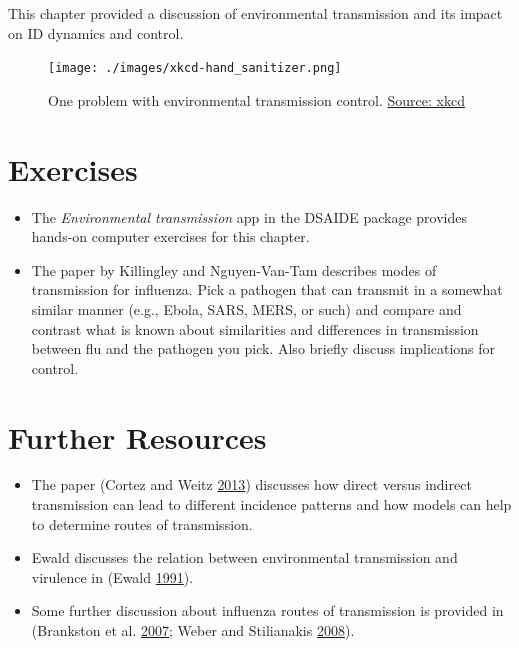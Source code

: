 \documentclass[
]{book}
\providecommand{\tightlist}{%
  \setlength{\itemsep}{0pt}\setlength{\parskip}{0pt}}
\begin{document}
This chapter provided a discussion of environmental transmission and its impact on ID dynamics and control.

\begin{figure}
\centering
\texttt{[image: ./images/xkcd-hand\_sanitizer.png]}
\caption{One problem with environmental transmission control. \href{https://xkcd.com/1161/}{Source: xkcd}}
\end{figure}

\hypertarget{exercises-6}{%
\section{Exercises}\label{exercises-6}}

\begin{itemize}
\tightlist
\item
  The \emph{Environmental transmission} app in the DSAIDE package provides hands-on computer exercises for this chapter.
\item
  The paper by Killingley and Nguyen-Van-Tam describes modes of transmission for influenza. Pick a pathogen that can transmit in a somewhat similar manner (e.g., Ebola, SARS, MERS, or such) and compare and contrast what is known about similarities and differences in transmission between flu and the pathogen you pick. Also briefly discuss implications for control.
\end{itemize}

\hypertarget{further-resources-6}{%
\section{Further Resources}\label{further-resources-6}}

\begin{itemize}
\tightlist
\item
  The paper (Cortez and Weitz \protect\hyperlink{ref-cortez13}{2013}) discusses how direct versus indirect transmission can lead to different incidence patterns and how models can help to determine routes of transmission.
\item
  Ewald discusses the relation between environmental transmission and virulence in (Ewald \protect\hyperlink{ref-ewald91}{1991}).
\item
  Some further discussion about influenza routes of transmission is provided in (Brankston et al. \protect\hyperlink{ref-brankston07}{2007}; Weber and Stilianakis \protect\hyperlink{ref-weber08}{2008}).
\end{itemize}
\end{document}
